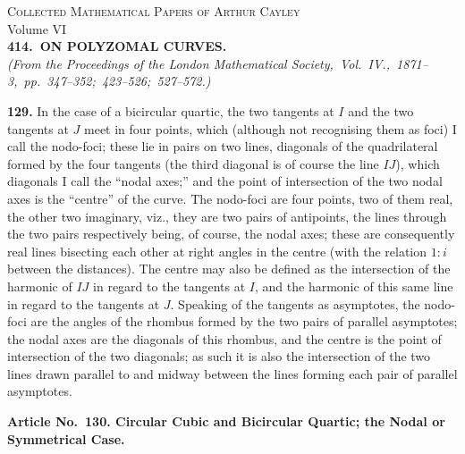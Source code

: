 \documentclass[12pt,a4paper]{article}
\theoremstyle{definition}
\begin{document}
\begin{center}
{\Large\scshape Collected Mathematical Papers of Arthur Cayley}\\[6pt]
{\large Volume VI}\\[12pt]
{\Large\bfseries 414.\ ON POLYZOMAL CURVES.}\\[6pt]
{\itshape (From the Proceedings of the London Mathematical Society,\ Vol.\ IV.,\ 1871--3,\ pp.\ 347--352;\ 423--526;\ 527--572.)}
\end{center}

\vspace{1em}


\vspace{1em}


\noindent\textbf{129.} In the case of a bicircular quartic, the two tangents at $I$ and the two
tangents at $J$ meet in four points, which (although not recognising them as foci) I
call the nodo-foci; these lie in pairs on two lines, diagonals of the quadrilateral formed
by the four tangents (the third diagonal is of course the line $IJ$), which diagonals
I call the ``nodal axes;'' and the point of intersection of the two nodal axes is the
``centre'' of the curve. The nodo-foci are four points, two of them real, the other two
imaginary, viz., they are two pairs of antipoints, the lines through the two pairs
respectively being, of course, the nodal axes; these are consequently real lines bisecting
each other at right angles in the centre (with the relation $1 : i$ between the distances).
The centre may also be defined as the intersection of the harmonic of $IJ$ in regard
to the tangents at $I$, and the harmonic of this same line in regard to the tangents
at $J$. Speaking of the tangents as asymptotes, the nodo-foci are the angles of the
rhombus formed by the two pairs of parallel asymptotes; the nodal axes are the
diagonals of this rhombus, and the centre is the point of intersection of the two
diagonals; as such it is also the intersection of the two lines drawn parallel to and
midway between the lines forming each pair of parallel asymptotes.

\vspace{0.5em}
\noindent\textbf{Article No.~130. Circular Cubic and Bicircular Quartic; the Nodal or Symmetrical
Case.}
\end{document}
